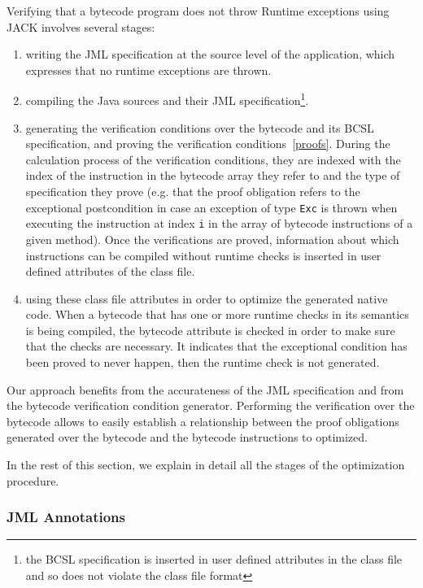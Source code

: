 Verifying that a bytecode program does not throw Runtime exceptions using JACK involves several stages:
\begin{enumerate}
\item writing the JML specification at the source level of the application, which expresses that no runtime exceptions are thrown.
\item compiling the Java sources and their JML specification\footnote{the BCSL specification is inserted in user defined attributes in the class file and so does not violate the class file format}.
\item generating the verification conditions over the bytecode and its BCSL specification, and proving the verification conditions~\ref{proofs}. During the calculation process of the verification conditions, they are indexed with the index of the instruction in the bytecode array they refer to and the type of specification they prove (e.g. that the proof obligation refers to the exceptional postcondition in case an exception of type \texttt{Exc} is thrown when executing the instruction at index \texttt{i} in the array of bytecode instructions of a given method). Once the verifications are proved, information about which instructions can be compiled without runtime checks is inserted in user defined attributes of the class file.
\item using these class file attributes in order to optimize the generated native code. When a bytecode that has one or more runtime checks in its semantics is being compiled, the bytecode attribute is checked in order to make sure that the checks are necessary. It indicates that the exceptional condition has been proved to never happen, then the runtime check is not generated.
\end{enumerate}

Our approach benefits from the accurateness of the JML specification and from the bytecode verification condition generator. Performing the verification over the bytecode allows to easily establish a relationship between the proof obligations generated over the bytecode and the bytecode instructions to optimized.

In the rest of this section, we explain in detail all the stages of the optimization procedure.

\subsubsection{JML Annotations}
\label{jml}

